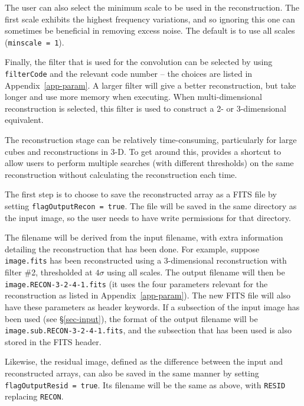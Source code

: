 The user can also select the minimum scale to be used in the
reconstruction. The first scale exhibits the highest frequency
variations, and so ignoring this one can sometimes be beneficial in
removing excess noise. The default is to use all scales
(\texttt{minscale = 1}).

Finally, the filter that is used for the convolution can be selected
by using \texttt{filterCode} and the relevant code number -- the
choices are listed in Appendix~\ref{app-param}. A larger filter will
give a better reconstruction, but take longer and use more memory when
executing. When multi-dimensional reconstruction is selected, this
filter is used to construct a 2- or 3-dimensional equivalent.

\label{sec-reconIO}

The reconstruction stage can be relatively time-consuming,
particularly for large cubes and reconstructions in 3-D. To get around
this, \duchamp provides a shortcut to allow users to perform multiple
searches (\eg with different thresholds) on the same reconstruction
without calculating the reconstruction each time.

The first step is to choose to save the reconstructed array as a FITS
file by setting \texttt{flagOutputRecon = true}. The file will be
saved in the same directory as the input image, so the user needs to
have write permissions for that directory.

The filename will be derived from the input filename, with extra
information detailing the reconstruction that has been done. For
example, suppose \texttt{image.fits} has been reconstructed using a
3-dimensional reconstruction with filter \#2, thresholded at $4\sigma$
using all scales. The output filename will then be
\texttt{image.RECON-3-2-4-1.fits} (\ie it uses the four parameters
relevant for the \atrous reconstruction as listed in
Appendix~\ref{app-param}). The new FITS file will also have these
parameters as header keywords. If a subsection of the input image has
been used (see \S\ref{sec-input}), the format of the output filename
will be \texttt{image.sub.RECON-3-2-4-1.fits}, and the subsection that
has been used is also stored in the FITS header.

Likewise, the residual image, defined as the difference between the
input and reconstructed arrays, can also be saved in the same manner
by setting \texttt{flagOutputResid = true}. Its filename will be the
same as above, with \texttt{RESID} replacing \texttt{RECON}.

